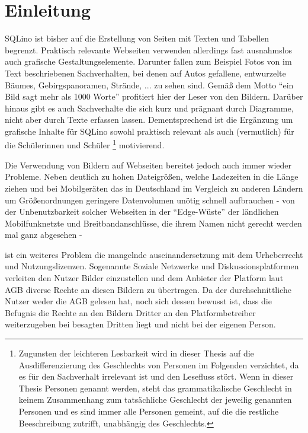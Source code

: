 \section{Einleitung}
\label{sec:introduction}

SQLino ist bisher auf die Erstellung von Seiten mit Texten und Tabellen begrenzt. Praktisch relevante Webseiten verwenden allerdings fast ausnahmslos auch grafische Gestaltungselemente. Darunter fallen zum Beispiel Fotos von im Text beschriebenen Sachverhalten, bei denen auf Autos gefallene, entwurzelte Bäumes, Gebirgspanoramen, Strände, ... zu sehen sind. Gemäß dem Motto \enquote{ein Bild sagt mehr als 1000 Worte} profitiert hier der Leser von den Bildern. Darüber hinaus gibt es auch Sachverhalte die sich kurz und prägnant durch Diagramme, nicht aber durch Texte erfassen lassen. Dementsprechend ist die Ergänzung um grafische Inhalte für SQLino sowohl praktisch relevant als auch (vermutlich) für die Schülerinnen und Schüler \footnote{Zugunsten der leichteren Lesbarkeit wird in dieser Thesis auf die Ausdifferenzierung des Geschlechts von Personen im Folgenden verzichtet, da es für den Sachverhalt irrelevant ist und den Lesefluss stört.  Wenn in dieser Thesis Personen genannt werden, steht das grammatikalische Geschlecht in keinem Zusammenhang zum tatsächliche Geschlecht der jeweilig genannten Personen und es sind immer alle Personen gemeint, auf die die restliche Beeschreibung zutrifft, unabhängig des Geschlechts.} motivierend.


Die Verwendung von Bildern auf Webseiten bereitet jedoch auch immer wieder Probleme. Neben deutlich zu hohen Dateigrößen, welche Ladezeiten in die Länge ziehen und bei
Mobilgeräten das in Deutschland im Vergleich zu anderen Ländern um
Größenordnungen geringere Datenvolumen unötig schnell aufbrauchen - von der
Unbenutzbarkeit solcher Webseiten in der ``Edge-Wüste'' der ländlichen
Mobilfunknetzte und Breitbandanschlüsse, die ihrem Namen nicht gerecht werden
mal ganz abgesehen - 


ist ein weiteres Problem die mangelnde auseinandersetzung
mit dem Urheberrecht und Nutzungslizenzen\todo{}. Sogenannte Soziale Netzwerke und
Diskussionsplatformen verleiten den Nutzer Bilder einzustellen und dem Anbieter der
Platform laut AGB diverse Rechte an diesen Bildern zu übertragen. Da der
durchschnittliche Nutzer weder die AGB gelesen hat, noch sich dessen bewusst
ist, dass die Befugnis die Rechte an den Bildern Dritter an den
Platformbetreiber weiterzugeben bei besagten Dritten liegt und nicht bei der
eigenen Person.


